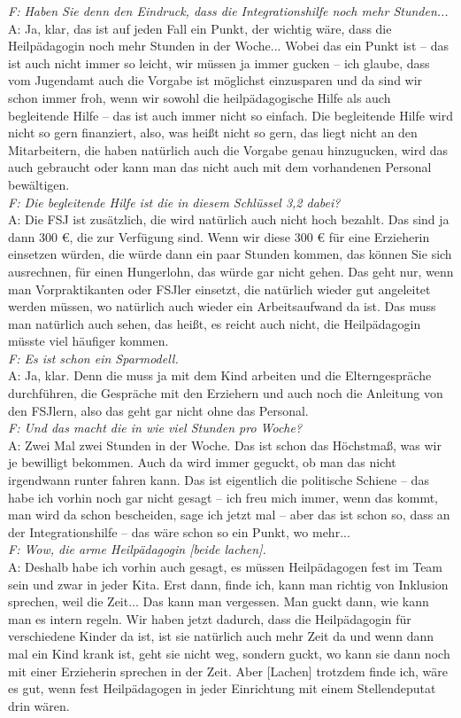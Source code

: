 \begin{linenumbers*}
\emph{F: Haben Sie denn den Eindruck, dass die Integrationshilfe noch mehr Stunden...}\\
A: Ja, klar, das ist auf jeden Fall ein Punkt, der wichtig wäre, dass die Heilpädagogin noch mehr Stunden in der Woche... Wobei das ein Punkt ist -- das ist auch nicht immer so leicht, wir müssen ja immer gucken -- ich glaube, dass vom Jugendamt auch die Vorgabe ist möglichst einzusparen und da sind wir schon immer froh, wenn wir sowohl die heilpädagogische Hilfe als auch begleitende Hilfe -- das ist auch immer nicht so einfach. Die begleitende Hilfe wird nicht so gern finanziert, also, was heißt nicht so gern, das liegt nicht an den Mitarbeitern, die haben natürlich auch die Vorgabe genau hinzugucken, wird das auch gebraucht oder kann man das nicht auch mit dem vorhandenen Personal bewältigen.\\
\emph{F: Die begleitende Hilfe ist die in diesem Schlüssel 3,2 dabei?}\\
A: Die FSJ ist zusätzlich, die wird natürlich auch nicht hoch bezahlt. Das sind ja dann 300 €, die zur Verfügung sind. Wenn wir diese 300 € für eine Erzieherin einsetzen würden, die würde dann ein paar Stunden kommen, das können Sie sich ausrechnen, für einen Hungerlohn, das würde gar nicht gehen. Das geht nur, wenn man Vorpraktikanten oder FSJler einsetzt, die natürlich wieder gut angeleitet werden müssen, wo natürlich auch wieder ein Arbeitsaufwand da ist. Das muss man natürlich auch sehen, das heißt, es reicht auch nicht, die Heilpädagogin müsste viel häufiger kommen.\\
\emph{F: Es ist schon ein Sparmodell.}\\
A: Ja, klar. Denn die muss ja mit dem Kind arbeiten und die Elterngespräche durchführen, die Gespräche mit den Erziehern und auch noch die Anleitung von den FSJlern, also das geht gar nicht ohne das Personal.\\
\emph{F: Und das macht die in wie viel Stunden pro Woche?}\\
A: Zwei Mal zwei Stunden in der Woche. Das ist schon das Höchstmaß, was wir je bewilligt bekommen. Auch da wird immer geguckt, ob man das nicht irgendwann runter fahren kann. Das ist eigentlich die politische Schiene -- das habe ich vorhin noch gar nicht gesagt -- ich freu mich immer, wenn das kommt, man wird da schon bescheiden, sage ich jetzt mal -- aber das ist schon so, dass an der Integrationshilfe -- das wäre schon so ein Punkt, wo mehr...\\
\emph{F: Wow, die arme Heilpädagogin {[beide lachen]}.}\\
A: Deshalb habe ich vorhin auch gesagt, es müssen Heilpädagogen fest im Team sein und zwar in jeder Kita. Erst dann, finde ich, kann man richtig von Inklusion sprechen, weil die Zeit... Das kann man vergessen. Man guckt dann, wie kann man es intern regeln. Wir haben jetzt dadurch, dass die Heilpädagogin für verschiedene Kinder da ist, ist sie natürlich auch mehr Zeit da und wenn dann mal ein Kind krank ist, geht sie nicht weg, sondern guckt, wo kann sie dann noch mit einer Erzieherin sprechen in der Zeit. Aber {[Lachen]} trotzdem finde ich, wäre es gut, wenn fest Heilpädagogen in jeder Einrichtung mit einem Stellendeputat drin wären.   


\end{linenumbers*}
